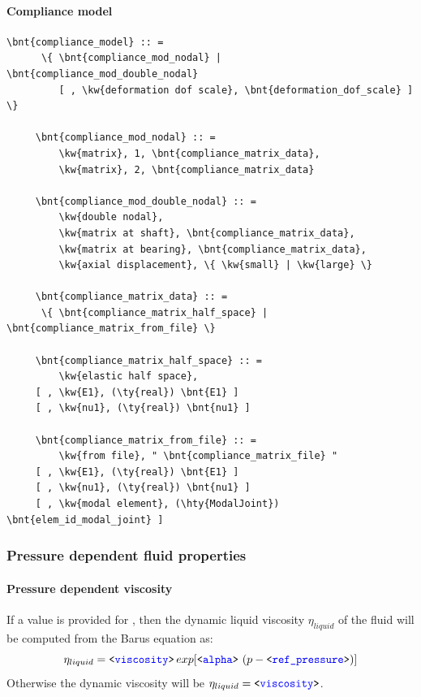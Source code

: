 \paragraph{Compliance model}
\begin{Verbatim}[commandchars=\\\{\}]
     \bnt{compliance_model} :: =
      \{ \bnt{compliance_mod_nodal} | \bnt{compliance_mod_double_nodal}
         [ , \kw{deformation dof scale}, \bnt{deformation_dof_scale} ] \}

     \bnt{compliance_mod_nodal} :: =
         \kw{matrix}, 1, \bnt{compliance_matrix_data},
         \kw{matrix}, 2, \bnt{compliance_matrix_data}

     \bnt{compliance_mod_double_nodal} :: =
         \kw{double nodal},
         \kw{matrix at shaft}, \bnt{compliance_matrix_data},
         \kw{matrix at bearing}, \bnt{compliance_matrix_data},
         \kw{axial displacement}, \{ \kw{small} | \kw{large} \}

     \bnt{compliance_matrix_data} :: =
      \{ \bnt{compliance_matrix_half_space} | \bnt{compliance_matrix_from_file} \}

     \bnt{compliance_matrix_half_space} :: =
         \kw{elastic half space},
     [ , \kw{E1}, (\ty{real}) \bnt{E1} ]
     [ , \kw{nu1}, (\ty{real}) \bnt{nu1} ]

     \bnt{compliance_matrix_from_file} :: =
         \kw{from file}, " \bnt{compliance_matrix_file} "
     [ , \kw{E1}, (\ty{real}) \bnt{E1} ]
     [ , \kw{nu1}, (\ty{real}) \bnt{nu1} ]
     [ , \kw{modal element}, (\hty{ModalJoint}) \bnt{elem_id_modal_joint} ]
\end{Verbatim}

\subsubsection{Pressure dependent fluid properties}
\paragraph{Pressure dependent viscosity}
If a value is provided for , then the dynamic liquid viscosity $\eta_{liquid}$ of the fluid will be computed from the Barus equation\cite{DIRKBARTEL2010} as:
\begin{equation}
\eta_{liquid}=\texttt{<\textcolor{blue}{viscosity}>}\,exp{\left[\texttt{<\textcolor{blue}{alpha}>}\,\left(p - \texttt{<\textcolor{blue}{ref\_pressure}>}\right)\right]}
\end{equation}
Otherwise the dynamic viscosity will be $\eta_{liquid}=\texttt{<\textcolor{blue}{viscosity}>}$.
